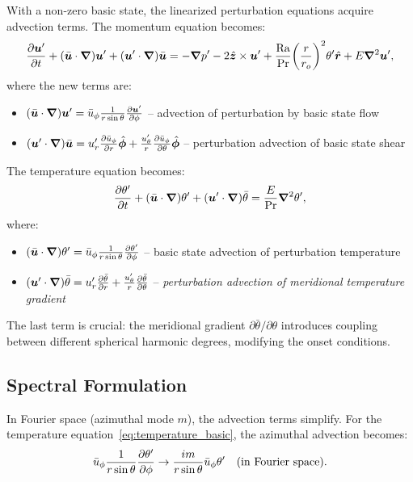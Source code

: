 \documentclass[11pt]{article}
\numberwithin{equation}{section}
\begin{document}
With a non-zero basic state, the linearized perturbation equations acquire advection terms. The momentum equation becomes:
\begin{equation}
  \pdv{\bm{u}'}{t} + (\bar{\bm{u}} \cdot \grad)\bm{u}' + (\bm{u}' \cdot \grad)\bar{\bm{u}}
  = -\grad p' - 2\hat{\bm{z}} \times \bm{u}' + \frac{\mathrm{Ra}}{\mathrm{Pr}} \qty(\frac{r}{r_o})^2 \theta' \hat{\bm{r}} + E\grad^2 \bm{u}',
  \label{eq:momentum_basic}
\end{equation}
where the new terms are:
\begin{itemize}
  \item $(\bar{\bm{u}} \cdot \grad)\bm{u}' = \bar{u}_\phi \frac{1}{r\sin\theta} \pdv{\bm{u}'}{\phi}$ -- advection of perturbation by basic state flow
  \item $(\bm{u}' \cdot \grad)\bar{\bm{u}} = u_r' \pdv{\bar{u}_\phi}{r} \hat{\bm{\phi}} + \frac{u_\theta'}{r} \pdv{\bar{u}_\phi}{\theta} \hat{\bm{\phi}}$ -- perturbation advection of basic state shear
\end{itemize}

The temperature equation becomes:
\begin{equation}
  \pdv{\theta'}{t} + (\bar{\bm{u}} \cdot \grad)\theta' + (\bm{u}' \cdot \grad)\bar{\theta} = \frac{E}{\mathrm{Pr}} \grad^2 \theta',
  \label{eq:temperature_basic}
\end{equation}
where:
\begin{itemize}
  \item $(\bar{\bm{u}} \cdot \grad)\theta' = \bar{u}_\phi \frac{1}{r\sin\theta} \pdv{\theta'}{\phi}$ -- basic state advection of perturbation temperature
  \item $(\bm{u}' \cdot \grad)\bar{\theta} = u_r' \pdv{\bar{\theta}}{r} + \frac{u_\theta'}{r} \pdv{\bar{\theta}}{\theta}$ -- \emph{perturbation advection of meridional temperature gradient}
\end{itemize}

The last term is crucial: the meridional gradient $\partial\bar{\theta}/\partial\theta$ introduces coupling between different spherical harmonic degrees, modifying the onset conditions.

\subsection{Spectral Formulation}

In Fourier space (azimuthal mode $m$), the advection terms simplify. For the temperature equation~\eqref{eq:temperature_basic}, the azimuthal advection becomes:
\begin{equation}
  \bar{u}_\phi \frac{1}{r\sin\theta} \pdv{\theta'}{\phi} \to \frac{im}{r\sin\theta} \bar{u}_\phi \theta' \quad \text{(in Fourier space)}.
  \label{eq:azimuthal_advection}
\end{equation}
\end{document}
